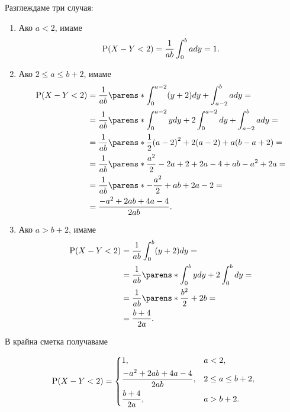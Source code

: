\documentclass{../../common/topic}
\begin{document}
\begin{solution}
\begin{enumerate}[label=\alph*)]
    Разглеждаме три случая:
    \begin{enumerate}[label=\arabic*)]
      \item Ако \( a < 2 \), имаме
      \begin{equation*}
        \operatorname{P}(X - Y < 2)
        =
        \frac 1 {ab} \int_0^b a dy
        =
        1.
      \end{equation*}

      \item Ако \( 2 \leq a \leq b + 2 \), имаме
      \begin{align*}
        \Prob(X - Y < 2)
        &=
        \frac 1 {ab} \parens*{\int_0^{a-2} (y+2) dy + \int_{a-2}^b a dy }
        = \\ &=
        \frac 1 {ab} \parens*{\int_0^{a-2} y dy + 2 \int_0^{a-2} dy + \int_{a-2}^b a dy }
        = \\ &=
        \frac 1 {ab} \parens*{\frac 1 2 {(a-2)}^2 + 2(a-2) + a(b-a+2) }
        = \\ &=
        \frac 1 {ab} \parens*{\frac {a^2} 2 - 2a + 2 + 2a - 4 + ab - a^2 + 2a }
        = \\ &=
        \frac 1 {ab} \parens*{-\frac {a^2} 2 + ab + 2a - 2 }
        = \\ &=
        \frac {-a^2 + 2ab + 4a - 4} {2ab}.
      \end{align*}

      \item Ако \( a > b + 2 \), имаме
      \begin{align*}
        \Prob(X - Y < 2)
        &=
        \frac 1 {ab} \int_0^b (y+2) dy
        = \\ &=
        \frac 1 {ab} \parens*{ \int_0^b y dy + 2 \int_0^b dy }
        = \\ &=
        \frac 1 {ab} \parens*{\frac {b^2} 2 + 2b }
        = \\ &=
        \frac {b + 4} {2a}.
      \end{align*}
    \end{enumerate}

    В крайна сметка получаваме

    \begin{align*}
      \operatorname{P}(X - Y < 2) = \begin{dcases}
        1, &a < 2, \\
        \frac {-a^2 + 2ab + 4a - 4} {2ab}, &2 \leq a \leq b + 2, \\
        \frac {b + 4} {2a}, &a > b + 2.
      \end{dcases}
    \end{align*}
  \end{enumerate}
\end{solution}

{
  \hfuzz=3pt
  \printbibliography
}
\end{document}
